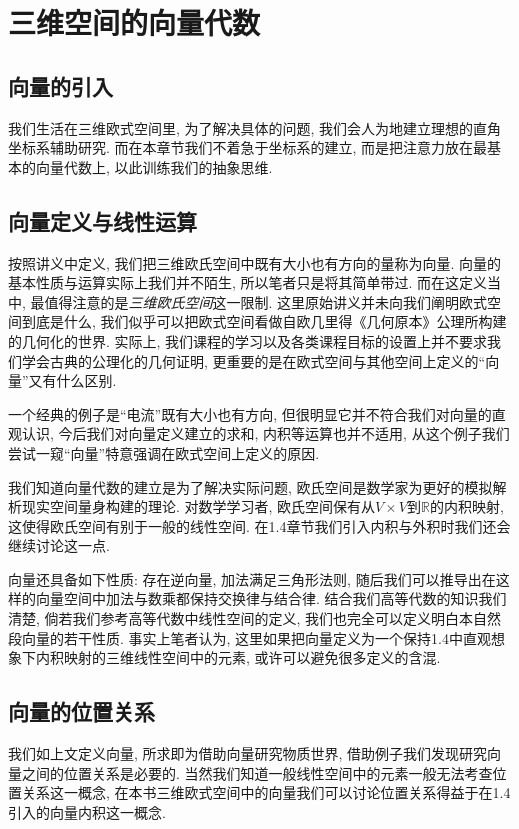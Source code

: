 \documentclass[./main.tex]{subfiles}
\begin{document}
\chapter{三维空间的向量代数}

\section{向量的引入}

我们生活在三维欧式空间里, 为了解决具体的问题, 我们会人为地建立理想的直角坐标系辅助研究. 而在本章节我们不着急于坐标系的建立, 而是把注意力放在最基本的向量代数上, 以此训练我们的抽象思维. 

\section{向量定义与线性运算}

按照讲义中定义, 我们把三维欧氏空间中既有大小也有方向的量称为向量. 向量的基本性质与运算实际上我们并不陌生, 所以笔者只是将其简单带过. 而在这定义当中, 最值得注意的是\textit{三维欧氏空间}这一限制. 这里原始讲义并未向我们阐明欧式空间到底是什么, 我们似乎可以把欧式空间看做自欧几里得《几何原本》公理所构建的几何化的世界. 实际上, 我们课程的学习以及各类课程目标的设置上并不要求我们学会古典的公理化的几何证明, 更重要的是在欧式空间与其他空间上定义的``向量''又有什么区别. 

一个经典的例子是``电流''既有大小也有方向, 但很明显它并不符合我们对向量的直观认识, 今后我们对向量定义建立的求和, 内积等运算也并不适用, 从这个例子我们尝试一窥``向量''特意强调在欧式空间上定义的原因. 

我们知道向量代数的建立是为了解决实际问题, 欧氏空间是数学家为更好的模拟解析现实空间量身构建的理论. 对数学学习者, 欧氏空间保有从\(V\times V\)到\(\mathbb{R}\)的内积映射, 这使得欧氏空间有别于一般的线性空间. 在1.4章节我们引入内积与外积时我们还会继续讨论这一点. 

向量还具备如下性质: 存在逆向量, 加法满足三角形法则, 随后我们可以推导出在这样的向量空间中加法与数乘都保持交换律与结合律. 结合我们高等代数的知识我们清楚, 倘若我们参考高等代数中线性空间的定义, 我们也完全可以定义明白本自然段向量的若干性质. 事实上笔者认为, 这里如果把向量定义为一个保持1.4中直观想象下内积映射的三维线性空间中的元素, 或许可以避免很多定义的含混. 

\section{向量的位置关系}

我们如上文定义向量, 所求即为借助向量研究物质世界, 借助例子我们发现研究向量之间的位置关系是必要的. 当然我们知道一般线性空间中的元素一般无法考查位置关系这一概念, 在本书三维欧式空间中的向量我们可以讨论位置关系得益于在1.4引入的向量内积这一概念. 
\end{document}
